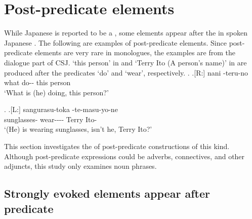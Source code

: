 \section{Post-predicate elements}\label{WOPostPreEles}

While Japanese is reported to be a  \cite{hinds86,shibatani90},
some elements appear after the  in spoken Japanese \cite{kuno78,onosuzuki92,fujii95,takami95a,takami95b,ono06,nakagawaetal08_paper}.
The following are examples of post-predicate elements.
Since post-predicate elements are very rare in monologues,
the examples are from the dialogue part of CSJ.
 `this person' in \Next and  `Terry Ito (A person's name)' in \NNext are produced after the predicates  `do' and  `wear', respectively.
%
\ex.
\ag.[R:] nani -teru-no   \\
 		what do-- this person \\
		`What is (he) doing, this person?'

\ex.\label{D02F0015_TerryIto}
 \ag.[L:] sangurasu-toka -te-masu-yo-ne   \\
		sunglasses- wear---\ab{fp}- Terry Ito- \\
		`(He) is wearing sunglasses, isn't he, Terry Ito?'

This section investigates the  of post-predicate constructions of this kind.
Although post-predicate expressions could be adverbs, connectives, and other adjuncts,
this study only examines noun phrases.

\subsection{Strongly evoked elements appear after predicate}\label{WORdis}

